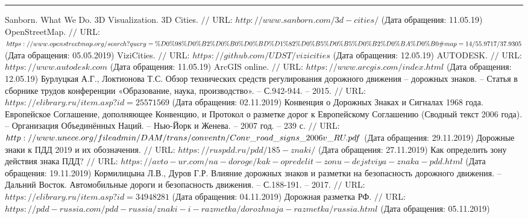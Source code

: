 \makeatletter \renewcommand{} \makeatother
\renewcommand\refname{Список использованных источников}
\begin{thebibliography}{00}
	
	
	
	\hrule
	
	
	Sanborn. What We Do. 3D Visualization. 3D Cities. $//$ URL: $http://www.sanborn.com/3d-cities/$ (Дата обращения: 11.05.19)
	OpenStreetMap. $//$ URL: $https://www.openstreetmap.org/search?\\query=\%D0\%98\%D0\%B2\%D0\%B0\%D0\%BD\%D1\%82\%D0\\\%B5\%D0\%B5\%D0\%B2\%D0\%BA\%D0\%B0\#map=14/55.9717/37.9305$ (Дата обращения: 05.05.2019)
	ViziCities. $//$ URL: $https://github.com/UDST/vizicities$ (Дата обращения: 12.05.19)
	AUTODESK. $//$ URL: $https://www.autodesk.com$ (Дата обращения: 11.05.19)
	ArcGIS online. $//$ URL: $https://www.arcgis.com/index.html$ (Дата обращения: 12.05.19)
	Бурлуцкая А.Г., Локтионова Т.С. Обзор технических средств регулирования дорожного движения -- дорожных знаков. -- Статья в сборнике трудов конференции «Образование, наука, производство». -- С.942-944. -- 2015. $//$ URL: $https://elibrary.ru/item.asp?id=25571569$ (Дата обращения: 02.11.2019)
	Конвенция о Дорожных Знаках и Сигналах 1968 года. Европейское Соглашение, дополняющее Конвенцию, и Протокол о разметке дорог к Европейскому Соглашению (Сводный текст 2006 года). -- Организация Объединённых Наций. -- Нью-Йорк и Женева. -- 2007 год. -- 239 с. $//$ URL: $http://www.unece.org/fileadmin/DAM/trans/conventn/Conv\_road\_\\
	signs\_2006v\_RU.pdf$ (Дата обращения: 29.11.2019)
	Дорожные знаки к ПДД 2019 и их обозначения. $//$ URL: $https://ruspdd.ru/pdd/185-znaki/$ (Дата обращения: 27.11.2019)
	Как определить зону действия знака ПДД? $//$ URL: $https://avto-ur.com/na-doroge/kak-opredelit-zonu-dejstviya-znaka-pdd.html$ (Дата обращения: 19.11.2019)
	Кормилицына Л.В., Дуров Г.Р. Влияние дорожных знаков и разметки на безопасность дорожного движения. -- Дальний Восток. Автомобильные дороги и безопасность движения. -- С.188-191. -- 2017. $//$ URL: $https://elibrary.ru/item.asp?id=34948281$ (Дата обращения: 04.11.2019)
	Дорожная разметка РФ. $//$ URL: $https://pdd-russia.com/pdd-russia/znaki-i-razmetka/dorozhnaja-razmetka/russia.html$ (Дата обращения: 05.11.2019)

\end{thebibliography}
